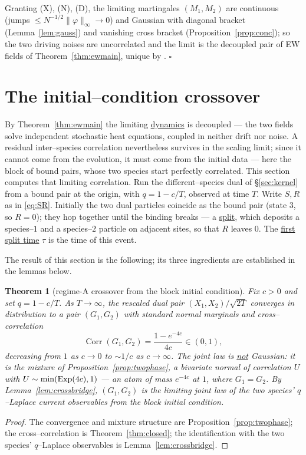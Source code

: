 \documentclass[11pt]{article}
\theoremstyle{plain}
\newtheorem{theorem}{Theorem}[section]
\theoremstyle{definition}
\theoremstyle{remark}
\DeclareMathOperator{\Corr}{Corr}\DeclareMathOperator{\cum}{cum}
\begin{document}
\noindent Granting (X), (N), (D), the limiting martingales $(M_1,M_2)$ are continuous
(jumps $\le N^{-1/2}\|\varphi\|_\infty\to0$) and Gaussian with diagonal bracket
(Lemma~\ref{lem:gauss}) and vanishing cross bracket (Proposition~\ref{prop:conc}); so
the two driving noises are uncorrelated and the limit is the decoupled pair of EW
fields of Theorem~\ref{thm:ewmain}, unique by \cite[Ch.~11]{KL}. \hfill$\square$

\section{The initial--condition crossover}\label{sec:cross}

By Theorem~\ref{thm:ewmain} the limiting \underline{dynamics} is decoupled --- the two fields
solve independent stochastic heat equations, coupled in neither drift nor noise. A
residual inter--species correlation nevertheless survives in the scaling limit; since it
cannot come from the evolution, it must come from the initial data --- here the block of
bound pairs, whose two species start perfectly correlated. This section computes that
limiting correlation. Run the different--species dual of \S\ref{sec:kernel} from a bound pair at
the origin, with $q=1-c/T$, observed at time $T$. Write $S,R$ as in \eqref{eq:SR}.
Initially the two dual particles coincide as the bound pair (state $3$, so $R=0$); they
hop together until the binding breaks --- a \underline{split}, which deposits a species--$1$
and a species--$2$ particle on adjacent sites, so that $R$ leaves $0$. The \underline{first
split time} $\tau$ is the time of this event.

The result of this section is the following; its three ingredients are established in the
lemmas below.

\begin{theorem}[regime-A crossover from the block initial condition]\label{thm:cross}
Fix $c>0$ and set $q=1-c/T$. As $T\to\infty$, the rescaled dual pair $(X_1,X_2)/\sqrt{2T}$
converges in distribution to a pair $(G_1,G_2)$ with standard normal marginals and
cross--correlation
\[
  \Corr(G_1,G_2)=\frac{1-e^{-4c}}{4c}\in(0,1),
\]
decreasing from $1$ as $c\to0$ to $\sim1/c$ as $c\to\infty$. The joint law is \underline{not}
Gaussian: it is the mixture of Proposition~\ref{prop:twophase}, a bivariate normal of
correlation $U$ with $U\sim\min(\mathrm{Exp}(4c),1)$ --- an atom of mass $e^{-4c}$ at $1$, where
$G_1=G_2$. By Lemma~\ref{lem:crossbridge}, $(G_1,G_2)$ is the limiting joint law of the
two species' $q$--Laplace current observables from the block initial condition.
\end{theorem}
\begin{proof}
The convergence and mixture structure are Proposition~\ref{prop:twophase}; the
cross--correlation is Theorem~\ref{thm:closed}; the identification with the two species'
$q$--Laplace observables is Lemma~\ref{lem:crossbridge}.
\end{proof}
\end{document}
